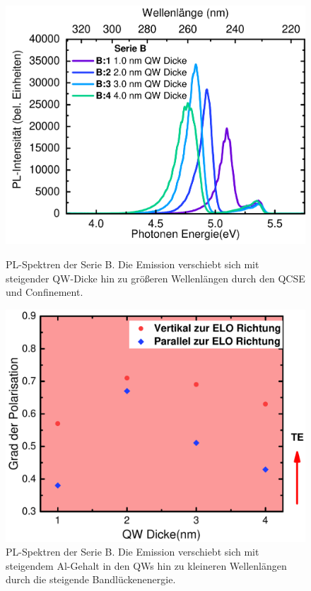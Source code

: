\begin{figure}[htb]
  \centering
  \begin{minipage}[t]{0.49\textwidth}
    \centering
    \includegraphics[width=\textwidth]{Bilder/spektrenQWvariation.pdf}
    \caption{PL-Spektren der Serie B. Die Emission verschiebt sich mit steigender QW-Dicke hin zu gr\"oßeren Wellenl\"angen durch den QCSE und Confinement.  }
    \label{fig:qwvariationSpektrum}
  \end{minipage}
	\hfill
  \begin{minipage}[t]{0.49\textwidth}
    \centering
    \includegraphics[width=\linewidth]{Bilder/polarisationDickenvariation.pdf}
    \caption{PL-Spektren der Serie B. Die Emission verschiebt sich mit steigendem Al-Gehalt in den QWs hin zu kleineren Wellenl\"angen durch die steigende Bandl\"uckenenergie. }
    \label{fig:qwvariationPolarisation}
  \end{minipage}
\end{figure}
